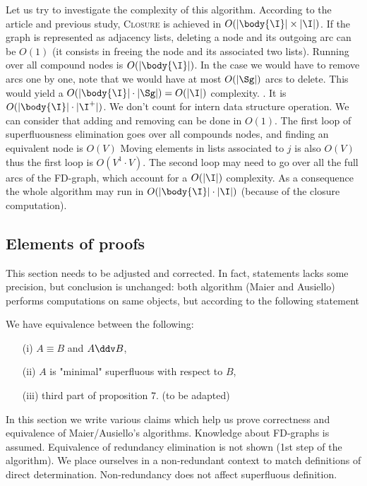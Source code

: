Let us try to investigate the complexity of this algorithm. According to the 
article and previous study, \textsc{Closure} is achieved in $O(|\body{\I}| 
\times |\I|)$. If the graph is
represented as adjacency lists, deleting a node and its outgoing arc can be
$O(1)$ (it consists in freeing the node and its associated two lists). Running 
over all compound nodes is $O(|\body{\I}|)$. In the case we would have to 
remove arcs one by one, note that we would have at most $O(|\Sg|)$ arcs to 
delete. This would yield a $O(|\body{\I}| \cdot |\Sg|) = O(|\I|)$
complexity. . It is $O(|\body{\I}| \cdot 
|\I^{+}|)$. We don't count for intern data structure operation. We can consider
that adding and removing can be done in $O(1)$. The first loop of 
superfluousness elimination goes over all compounds nodes, and finding an 
equivalent node is $O(V)$ Moving elements in lists associated to $j$ is also
$O(V)$ thus the first loop is $O(V^1 \cdot V)$. The second loop may need to 
go over all the full arcs of the FD-graph, which account for a $O(|\I|)$ 
complexity. As a consequence the whole algorithm may run in $O(|\body{\I}| 
\cdot |\I|)$ (because of the closure computation).



\subsection{Elements of proofs}

{\color{alizarine}
This section needs to be adjusted and corrected. In fact, statements lacks
some precision, but conclusion is unchanged: both algorithm (Maier and 
Ausiello) performs computations on same objects, but according to the 
following statement 

\begin{proposition} We have equivalence between the following:
\begin{itemize}
	\item[(i)] $A \equiv B$ and $A \ddv B$,
	\item[(ii)] $A$ is "minimal" superfluous with respect to $B$,
	\item[(iii)] third part of proposition 7. (to be adapted)
\end{itemize}
	
\end{proposition}	
	
	
}

In this section we write various claims which help us prove correctness and 
equivalence of Maier/Ausiello's algorithms. Knowledge about FD-graphs is 
assumed. Equivalence of redundancy elimination is not shown (1st step of 
the algorithm). We place ourselves in a non-redundant context to match
definitions of direct determination. Non-redundancy does not affect superfluous
definition.

